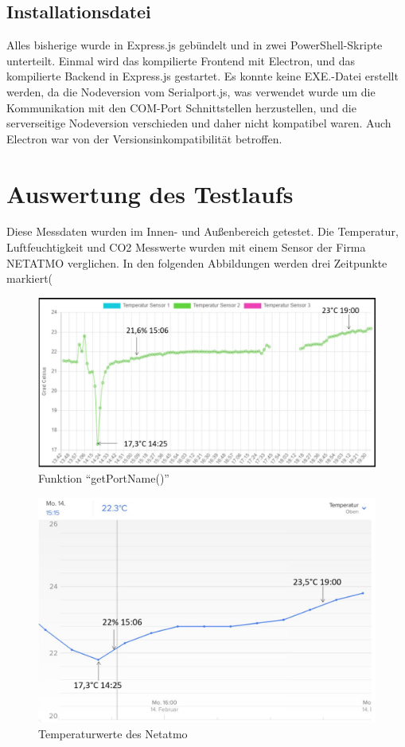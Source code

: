 \documentclass[]{article}
\begin{document}
			\subsection{Installationsdatei}
			Alles bisherige wurde in Express.js gebündelt und in zwei PowerShell-Skripte unterteilt. Einmal wird das kompilierte Frontend mit Electron, und das kompilierte Backend in Express.js gestartet.
			Es konnte keine EXE.-Datei erstellt werden, da die Nodeversion vom Serialport.js, was verwendet wurde um die Kommunikation mit den COM-Port Schnittstellen herzustellen, und die serverseitige Nodeversion verschieden und daher nicht kompatibel waren. Auch Electron war von der Versionsinkompatibilität betroffen. 
			
	\section{Auswertung des Testlaufs}
			Diese Messdaten wurden im Innen- und Außenbereich getestet. Die Temperatur, Luftfeuchtigkeit und CO2 Messwerte wurden mit einem Sensor der Firma NETATMO verglichen. In den folgenden Abbildungen werden drei Zeitpunkte markiert(%
			\begin{figure}[!h]
				\centering
				\includegraphics[scale=0.18]{images/temp_proj}
				\caption{Funktion “getPortName()”}
				\label{img:temp_proj}
			\end{figure}
			\begin{figure}[!h]
				\centering
				\includegraphics[scale=0.18]{images/temp_NETATMO}
				\caption{Temperaturwerte des Netatmo}
				\label{img:temp_NETATMO}
			\end{figure}
\end{document}
